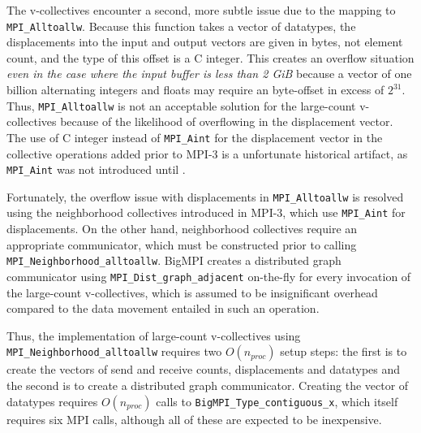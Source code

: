 
The v-collectives encounter a second, more subtle issue due to the mapping to
\texttt{MPI\_Alltoallw}.  Because this function takes a vector of datatypes, the
displacements into the input and output vectors are given in bytes,
not element count, and the type of this offset is a C integer.
This creates an overflow situation \textit{even in the case
where the input buffer is less than 2 GiB} because a vector of one billion
alternating integers and floats may require an byte-offset in excess of $2^{31}$.
Thus, \texttt{MPI\_Alltoallw} is not an acceptable solution for the large-count
v-collectives because of the likelihood of overflowing in the displacement vector.
The use of C integer instead of \texttt{MPI\_Aint} for the displacement vector in
the  collective operations added prior to MPI-3 is a unfortunate historical artifact,
as \texttt{MPI\_Aint} was not introduced until .


Fortunately, the overflow issue with displacements in \texttt{MPI\_Alltoallw} is
resolved using the neighborhood collectives introduced in MPI-3, which
use \texttt{MPI\_Aint} for displacements.
On the other hand, neighborhood collectives require an appropriate
communicator, which must be constructed prior to calling \texttt{MPI\_Neighborhood\_alltoallw}.
BigMPI creates a distributed graph communicator using \texttt{MPI\_Dist\_graph\_adjacent}
on-the-fly for every invocation of the large-count v-collectives, which is assumed to be
insignificant overhead compared to the data movement entailed in such an operation.

Thus, the implementation of large-count v-collectives using \texttt{MPI\_Neighborhood\_alltoallw} 
requires two $O(n_{proc})$ setup steps: the first is to create the vectors of send and receive
counts, displacements and datatypes and the second is to create a distributed graph communicator.
Creating the vector of datatypes requires $O(n_{proc})$ calls to \texttt{BigMPI\_Type\_contiguous\_x},
which itself requires six MPI calls, although all of these are expected to be inexpensive.


